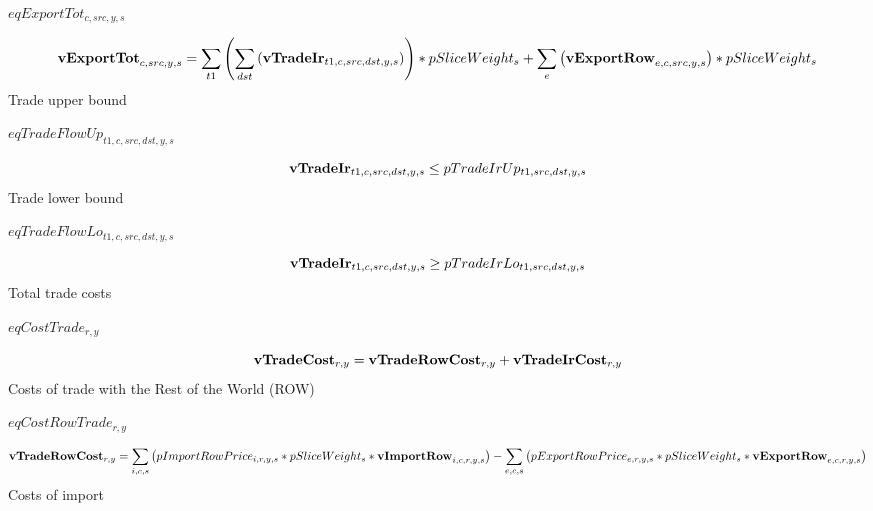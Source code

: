 \documentclass{article}
\begin{document}
$eqExportTot_{c,src,y,s}$





\begin{dmath}
{\bf vExportTot}_{c,src,y,s}  =  \sum_{t1}{\left(\sum_{dst}{\left({\bf vTradeIr}_{t1,c,src,dst,y,s}\right)}\right)}*pSliceWeight_{s}+\sum_{e}{\left({\bf vExportRow}_{e,c,src,y,s}\right)}*pSliceWeight_{s}
\end{dmath}
Trade upper bound







$eqTradeFlowUp_{t1,c,src,dst,y,s}$





\begin{dmath}
{\bf vTradeIr}_{t1,c,src,dst,y,s}  \le  pTradeIrUp_{t1,src,dst,y,s}
\end{dmath}
Trade lower bound







$eqTradeFlowLo_{t1,c,src,dst,y,s}$





\begin{dmath}
{\bf vTradeIr}_{t1,c,src,dst,y,s}  \ge  pTradeIrLo_{t1,src,dst,y,s}
\end{dmath}
Total trade costs







$eqCostTrade_{r,y}$





\begin{dmath}
{\bf vTradeCost}_{r,y}  =  {\bf vTradeRowCost}_{r,y}+{\bf vTradeIrCost}_{r,y}
\end{dmath}
Costs of trade with the Rest of the World (ROW)







$eqCostRowTrade_{r,y}$





\begin{dmath}
{\bf vTradeRowCost}_{r,y}  =  \sum_{i,c,s}{\left(pImportRowPrice_{i,r,y,s}*pSliceWeight_{s}*{\bf vImportRow}_{i,c,r,y,s}\right)}-\sum_{e,c,s}{\left(pExportRowPrice_{e,r,y,s}*pSliceWeight_{s}*{\bf vExportRow}_{e,c,r,y,s}\right)}
\end{dmath}
Costs of import
\end{document}
